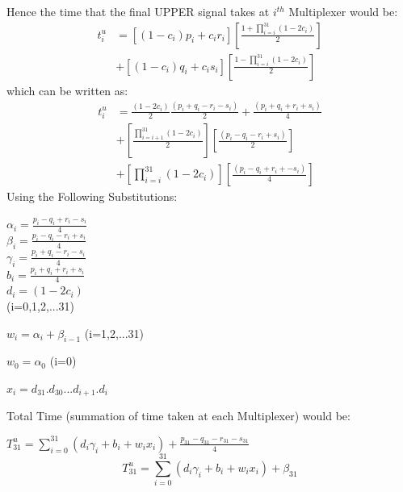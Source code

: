 \documentclass{article}
\begin{document}
Hence the time that the final UPPER signal takes at $ i^{th}$ Multiplexer would be:
\Large
\begin{equation}
  \begin{split}
    t_{i}^{u} &= [(1-c_{i})p_i + c_ir_i ] [\frac{1 + \prod_{i=i}^{31} (1-2c_i)}{2}] \\
              &+ [ (1-c_{i})q_i + c_is_i] [\frac{1 - \prod_{i=i}^{31} (1-2c_i)}{2}]
  \end{split}
\end{equation}
\large
which can be written as:
\Large
\begin{equation}
  \begin{split}
    t_{i}^{u} &= \frac{(1-2c_i)}{2} \frac{(p_i + q_i - r_i - s_i)}{2} + \frac{(p_i + q_i + r_i + s_i)}{4} \\
              &+ [\frac{\prod_{i=i+1}^{31} (1-2c_i)}{2}][ \frac{(p_i - q_i - r_i + s_i)}{2}] \\
              &+ [{\prod_{i=i}^{31} (1-2c_i)}][ \frac{(p_i - q_i + r_i +-s_i)}{4}]
  \end{split}
\end{equation}
\large
Using the Following Substitutions:
\Large
\begin{center}
  $\alpha_i = \frac{p_i - q_i + r_i - s_i}{4} $\\
  $\beta_i = \frac{p_i - q_i - r_i + s_i}{4} $\\
  $\gamma_i = \frac{p_i + q_i - r_i - s_i}{4}$\\
  $b_i = \frac{p_i + q_i + r_i + s_i}{4}$\\
  $d_i = (1-2c_i)$\\
  \large(i=0,1,2,...31)\\

\end{center}
\begin{center}
  \Large$w_i = \alpha_i + \beta_{i-1}$  \large(i=1,2,...31)\\
\end{center}
\begin{center}
  \Large$w_0 = \alpha_0$ \large (i=0)\\
\end{center}
\begin{center}
  \Large$x_i = d_{31}.d_{30}...d_{i+1}.d_{i} $
\end{center}
\large
Total Time (summation of time taken at each Multiplexer) would be:
\begin{center}
  \Large$T_{31}^{u} = \sum_{i=0}^{31} (d_i\gamma_i + b_i + w_ix_i) + \frac{p_{31} - q_{31} - r_{31} - s_{31}}{4}$\\
  \begin{equation}
  T_{31}^{u} = \sum_{i=0}^{31} (d_i\gamma_i + b_i + w_ix_i) + \beta_{31}
  \end{equation}
\end{center}
\end{document}
